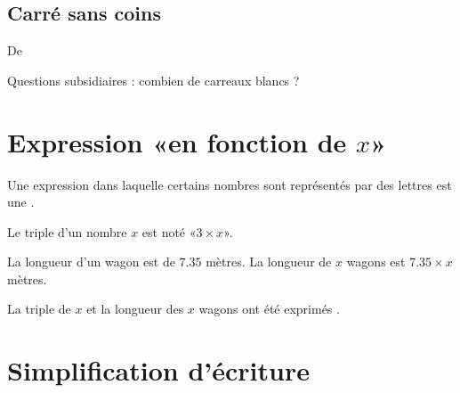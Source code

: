 
\subsection*{Carré sans coins}


De \cite{NRHooXFvgpp5}

Questions subsidiaires : combien de carreaux blancs ?

\section{Expression «en fonction de \( x\)» }

\begin{definition}
    Une expression dans laquelle certains nombres sont représentés par des lettres est une .
\end{definition}

\begin{example}
    Le triple d'un nombre \( x\) est noté «\( 3\times x\)».
\end{example}

\begin{example}
    La longueur d'un wagon est de \( 7.35\) mètres. La longueur de \( x\) wagons est \( 7.35\times x\) mètres.
\end{example}

La triple de \( x\) et la longueur des \( x\) wagons ont été exprimés .

\section{Simplification d'écriture}

